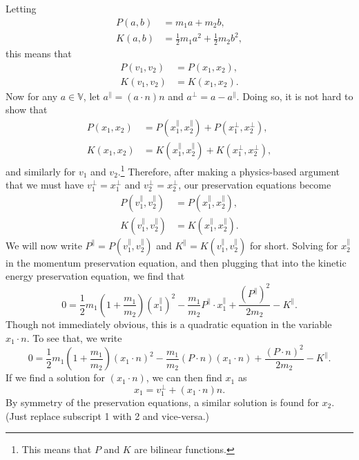 \documentclass[12pt]{article}
\newcommand{\V}{\mathbb{V}}
\newcommand{\prl}{\parallel}
\newcommand{\prp}{\perp}
\begin{document}
Letting
\begin{align*}
P(a,b)&=m_1a+m_2b,\\
K(a,b)&=\frac{1}{2}m_1a^2+\frac{1}{2}m_2b^2,
\end{align*}
this means that
\begin{align*}
P(v_1,v_2)&=P(x_1,x_2),\\
K(v_1,v_2)&=K(x_1,x_2).
\end{align*}
Now for any $a\in\V$, let $a^{\prl}=(a\cdot n)n$ and $a^{\prp}=a-a^{\prl}$.  Doing so, it is not hard to show that
\begin{align*}
P(x_1,x_2) &= P(x_1^{\prl},x_2^{\prl})+P(x_1^{\prp},x_2^{\prp}), \\
K(x_1,x_2) &= K(x_1^{\prl},x_2^{\prl})+K(x_1^{\prp},x_2^{\prp}),
\end{align*}
and similarly for $v_1$ and $v_2$.\footnote{This means that $P$ and $K$ are bilinear functions.}
Therefore, after making a physics-based argument that we must have $v_1^{\prp}=x_1^{\prp}$ and $v_2^{\prp}=x_2^{\prp}$,
our preservation equations become
\begin{align*}
P(v_1^{\prl},v_2^{\prl})&=P(x_1^{\prl},x_2^{\prl}),\\
K(v_1^{\prl},v_2^{\prl})&=K(x_1^{\prl},x_2^{\prl}).
\end{align*}
We will now write $P^{\prl}=P(v_1^{\prl},v_2^{\prl})$ and $K^{\prl}=K(v_1^{\prl},v_2^{\prl})$ for short.
Solving for $x_2^{\prl}$ in the momentum preservation equation, and then plugging that into
the kinetic energy preservation equation, we find that
\begin{equation*}
0 = \frac{1}{2}m_1\left(1+\frac{m_1}{m_2}\right)(x_1^{\prl})^2 - \frac{m_1}{m_2}P^{\prl}\cdot x_1^{\prl} + \frac{(P^{\prl})^2}{2m_2} - K^{\prl}.
\end{equation*}
Though not immediately obvious, this is a quadratic equation in the variable $x_1\cdot n$.  To see that, we write
\begin{equation*}
0 = \frac{1}{2}m_1\left(1+\frac{m_1}{m_2}\right)(x_1\cdot n)^2 - \frac{m_1}{m_2}(P\cdot n)(x_1\cdot n) + \frac{(P\cdot n)^2}{2m_2} - K^{\prl}.
\end{equation*}
If we find a solution for $(x_1\cdot n)$, we can then find $x_1$ as
\begin{equation*}
x_1=v_1^{\prp}+(x_1\cdot n)n.
\end{equation*}
By symmetry of the preservation equations, a similar solution is found for $x_2$.  (Just replace subscript 1 with 2 and vice-versa.)
\end{document}
